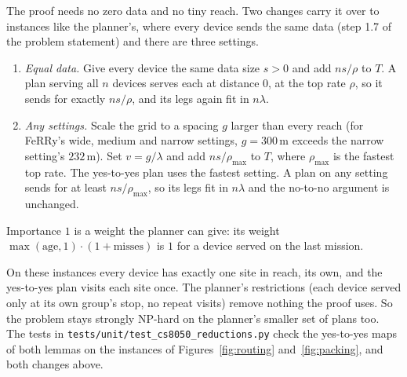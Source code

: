 \begin{remark}
\label{rem:code-model}
The proof needs no zero data and no tiny reach. Two changes carry it over
to instances like the planner's, where every device sends the same data
(step 1.7 of the problem statement) and there are three settings.
\begin{enumerate}
  \item \emph{Equal data.} Give every device the same data size $s>0$ and
    add $ns/\rho$ to $T$. A plan serving all $n$ devices serves each at
    distance $0$, at the top rate $\rho$, so it sends for exactly $ns/\rho$,
    and its legs again fit in $n\lambda$.
  \item \emph{Any settings.} Scale the grid to a spacing $g$ larger than
    every reach (for FeRRy's wide, medium and narrow settings, $g=300$\,m
    exceeds the narrow setting's $232$\,m). Set $v=g/\lambda$ and add
    $ns/\rho_{\max}$ to $T$, where $\rho_{\max}$ is the fastest top rate.
    The yes-to-yes plan uses the fastest setting. A plan on any setting
    sends for at least $ns/\rho_{\max}$, so its legs fit in $n\lambda$ and
    the no-to-no argument is unchanged.
\end{enumerate}
Importance $1$ is a weight the planner can give: its weight
$\max(\mathrm{age},1)\cdot(1+\mathrm{misses})$ is $1$ for a device served on
the last mission.

On these instances every device has exactly one site in reach, its own, and
the yes-to-yes plan visits each site once. The planner's restrictions
(each device served only at its own group's stop, no repeat visits) remove
nothing the proof uses. So the problem stays strongly NP-hard on the
planner's smaller set of plans too. The tests in
\texttt{tests/unit/test\_cs8050\_reductions.py} check the yes-to-yes maps of
both lemmas on the instances of Figures~\ref{fig:routing}
and~\ref{fig:packing}, and both changes above.
\end{remark}

